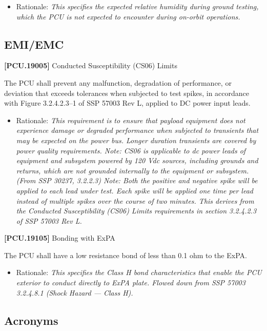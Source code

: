 \begin{itemize}
\item{} Rationale: \emph{This specifies the expected relative humidity during ground testing, which the PCU is not expected to encounter during on-orbit operations.}

\end{itemize}

\section{EMI\slash EMC}
\label{emiemc}

\textbf{[PCU.19005]} Conducted Susceptibility (CS06) Limits

The \gls{PCU} shall prevent any malfunction, degradation of performance, or deviation that exceeds tolerances when subjected to test spikes, in accordance with Figure 3.2.4.2.3--1 of SSP 57003 Rev L, applied to DC power input leads.

\begin{itemize}
\item{} Rationale: \emph{This requirement is to ensure that payload equipment does not experience damage or degraded performance when subjected to transients that may be expected on the power bus. Longer duration transients are covered by power quality requirements. Note: CS06 is applicable to dc power leads of equipment and subsystem powered by 120 Vdc sources, including grounds and returns, which are not grounded internally to the equipment or subsystem. (From SSP 30237, 3.2.2.3) Note: Both the positive and negative spike will be applied to each lead under test. Each spike will be applied one time per lead instead of multiple spikes over the course of two minutes. This derives from the Conducted Susceptibility (CS06) Limits requirements in section 3.2.4.2.3 of SSP 57003 Rev L.}

\end{itemize}

\textbf{[PCU.19105]} Bonding with \gls{ExPA}

The \gls{PCU} shall have a low resistance bond of less than 0.1 ohm to the \gls{ExPA}.

\begin{itemize}
\item{} Rationale: \emph{This specifies the Class H bond characteristics that enable the PCU exterior to conduct directly to ExPA plate. Flowed down from SSP 57003 3.2.4.8.1 (Shock Hazard --- Class H).}

\end{itemize}


\begin{appendices}


\chapter{Acronyms  }
\label{sec_acros}

\printglossary[type=\acronymtype]

\end{appendices}




